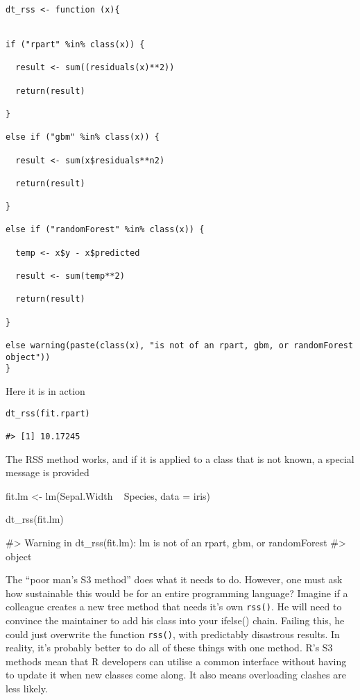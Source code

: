 \begin{verbatim}
dt_rss <- function (x){


if ("rpart" %in% class(x)) {
  
  result <- sum((residuals(x)**2))
  
  return(result)
  
}

else if ("gbm" %in% class(x)) {
  
  result <- sum(x$residuals**n2)
  
  return(result)

}

else if ("randomForest" %in% class(x)) {

  temp <- x$y - x$predicted  
  
  result <- sum(temp**2)  
  
  return(result)

}
  
else warning(paste(class(x), "is not of an rpart, gbm, or randomForest object"))
}
\end{verbatim}

Here it is in action

\begin{verbatim}
dt_rss(fit.rpart)

#> [1] 10.17245
\end{verbatim}

The RSS method works, and if it is applied to a class that is not known,
a special message is provided

\begin{Schunk}
\begin{Sinput}
fit.lm <- lm(Sepal.Width ~ Species, data = iris)

dt_rss(fit.lm)
\end{Sinput}
\begin{Soutput}
#> Warning in dt_rss(fit.lm): lm is not of an rpart, gbm, or randomForest
#> object
\end{Soutput}
\end{Schunk}

The ``poor man's S3 method'' does what it needs to do. However, one must
ask how sustainable this would be for an entire programming language?
Imagine if a colleague creates a new tree method that needs it's own
\texttt{rss()}. He will need to convince the maintainer to add his class
into your ifelse() chain. Failing this, he could just overwrite the
function \texttt{rss()}, with predictably disastrous results. In
reality, it's probably better to do all of these things with one method.
R's S3 methods mean that R developers can utilise a common interface
without having to update it when new classes come along. It also means
overloading clashes are less likely.

